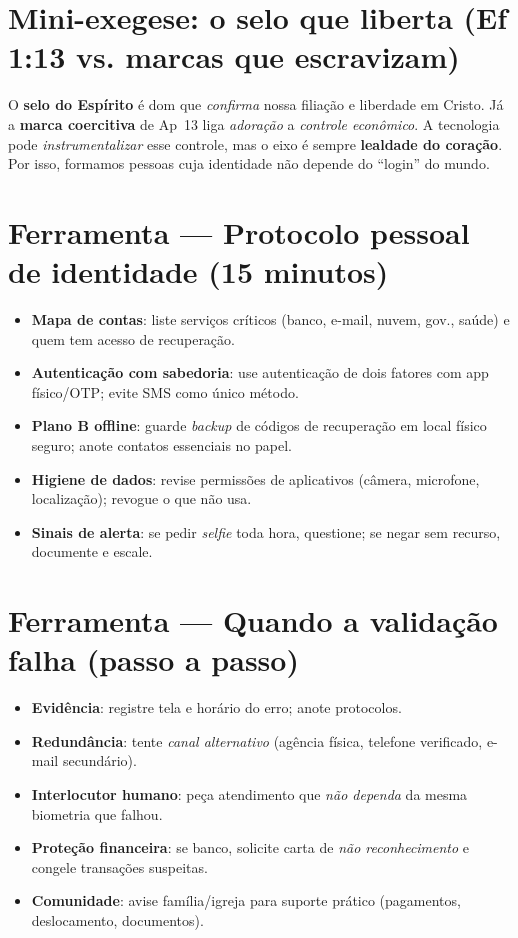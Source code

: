 \section{Mini-exegese: o selo que liberta (Ef 1:13 vs. marcas que escravizam)}
O \textbf{selo do Espírito} é dom que \emph{confirma} nossa filiação e liberdade em Cristo. Já a \textbf{marca coercitiva} de Ap~13 liga \emph{adoração} a \emph{controle econômico}. A tecnologia pode \emph{instrumentalizar} esse controle, mas o eixo é sempre \textbf{lealdade do coração}. Por isso, formamos pessoas cuja identidade não depende do ``login'' do mundo.

\section{Ferramenta --- Protocolo pessoal de identidade (15 minutos)}
\begin{checklist}
\begin{itemize}[leftmargin=*,noitemsep]
  \item \textbf{Mapa de contas}: liste serviços críticos (banco, e-mail, nuvem, gov., saúde) e quem tem acesso de recuperação.
  \item \textbf{Autenticação com sabedoria}: use autenticação de dois fatores com app físico/OTP; evite SMS como único método.
  \item \textbf{Plano B offline}: guarde \emph{backup} de códigos de recuperação em local físico seguro; anote contatos essenciais no papel.
  \item \textbf{Higiene de dados}: revise permissões de aplicativos (câmera, microfone, localização); revogue o que não usa.
  \item \textbf{Sinais de alerta}: se pedir \emph{selfie} toda hora, questione; se negar sem recurso, documente e escale.
\end{itemize}
\end{checklist}

\section{Ferramenta --- Quando a validação falha (passo a passo)}
\begin{checklist}[title={Recuperação de acesso},breakable]
\begin{itemize}[leftmargin=*,noitemsep]
  \item \textbf{Evidência}: registre tela e horário do erro; anote protocolos.
  \item \textbf{Redundância}: tente \emph{canal alternativo} (agência física, telefone verificado, e-mail secundário).
  \item \textbf{Interlocutor humano}: peça atendimento que \emph{não dependa} da mesma biometria que falhou.
  \item \textbf{Proteção financeira}: se banco, solicite carta de \emph{não reconhecimento} e congele transações suspeitas.
  \item \textbf{Comunidade}: avise família/igreja para suporte prático (pagamentos, deslocamento, documentos).
\end{itemize}
\end{checklist}

